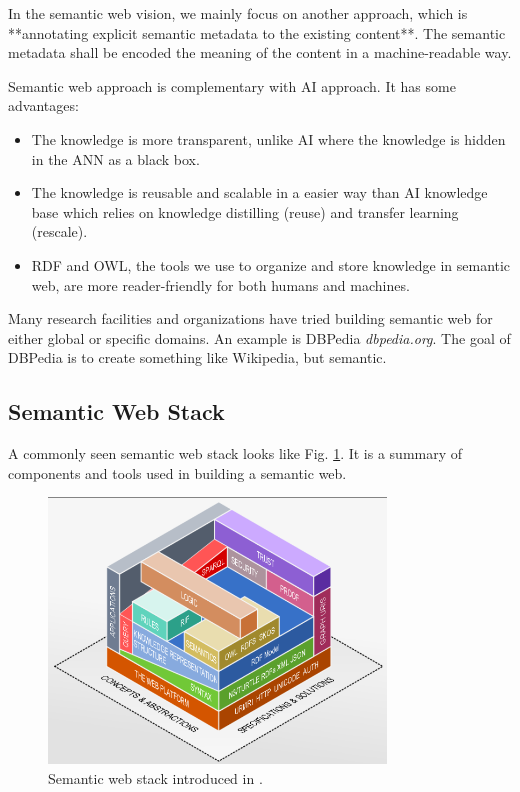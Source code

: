 In the semantic web vision, we mainly focus on another approach, which is **annotating explicit semantic metadata to the existing content**. The semantic metadata shall be encoded the meaning of the content in a machine-readable way.

Semantic web approach is complementary with AI approach. It has some advantages:
\begin{itemize}
  \item The knowledge is more transparent, unlike AI where the knowledge is hidden in the ANN as a black box.
  \item The knowledge is reusable and scalable in a easier way than AI knowledge base which relies on knowledge distilling (reuse) and transfer learning (rescale).
  \item RDF and OWL, the tools we use to organize and store knowledge in semantic web, are more reader-friendly for both humans and machines.
\end{itemize}

Many research facilities and organizations have tried building semantic web for either global or specific domains. An example is DBPedia \textit{dbpedia.org}. The goal of DBPedia is to create something like Wikipedia, but semantic.

\subsection{Semantic Web Stack} \label{subsec:semanticwebstack}

A commonly seen semantic web stack looks like Fig. \ref{fig:semanticwebstack}. It is a summary of components and tools used in building a semantic web.

\begin{figure}[htbp]
	\centering
	\includegraphics[width=0.8\textwidth]{./chapters/ch-semanticwebbasics/figures/semanticwebstack.png}
	\caption{Semantic web stack introduced in \cite{semanticwebstack}.}
	\label{fig:semanticwebstack}
\end{figure}

